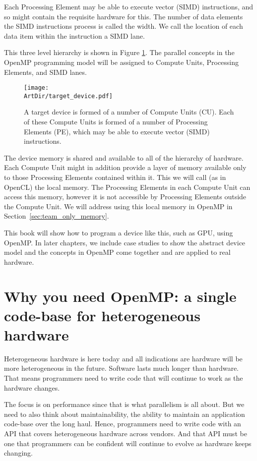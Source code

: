 Each Processing Element may be able to execute vector (SIMD) instructions, and so might contain the requisite hardware for this.
The number of data elements the SIMD instructions process is called the width.
We call the location of each data item within the instruction a SIMD lane.

This three level hierarchy is shown in Figure \ref{figure:target_device_hierarchy}.
The parallel concepts in the OpenMP programming model will be assigned to Compute Units, Processing Elements, and SIMD lanes.

\begin{figure}[t]
\centerline{\texttt{[image: \\ArtDir/target\_device.pdf]}}
\caption{A target device is formed of a number of Compute Units (CU). Each of these Compute Units is formed of a number of Processing Elements (PE), which may be able to execute vector (SIMD) instructions.}
\label{figure:target_device_hierarchy}
\end{figure}

The device memory is shared and available to all of the hierarchy of hardware.
Each Compute Unit might in addition provide a layer of memory available only to those Processing Elements contained within it.
This we will call (as in OpenCL) the local memory.
The Processing Elements in each Compute Unit can access this memory, however it is not accessible by Processing Elements outside the Compute Unit.
We will address using this local memory in OpenMP in Section~\ref{sec:team_only_memory}.

This book will show how to program a device like this, such as GPU, using OpenMP.
In later chapters, we include case studies to show the abstract device model and the concepts in OpenMP come together and are applied to real hardware.


\section{Why you need OpenMP: a single code-base for heterogeneous hardware}

 Heterogeneous hardware is here today and all indications are hardware will
be more heterogeneous in the future.  Software lasts much longer than hardware.   That means
programmers need to write code that will continue to work as the hardware changes.  

The focus is on performance since that is what parallelism is all about.  But we need to also think about 
maintainability, the ability to maintain an application code-base over the long haul.  Hence, programmers
need to write code with an API that covers heterogeneous hardware across vendors.  And that API
must be one that programmers can be confident will continue to evolve as hardware keeps changing.

